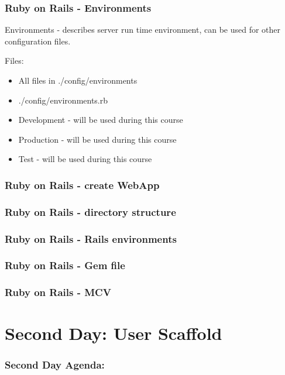 \documentclass{beamer}
\theoremstyle{mystyle}
\begin{document}
\begin{frame}
  \frametitle{Ruby on Rails - Environments}
  \begin{definition}
      Environments - describes server run time environment, can be used for other
      configuration files.
  \end{definition}
  Files:
  \begin{itemize}
  \item All files in ./config/environments
  \item ./config/environments.rb
  \end{itemize}
  \begin{example}
    \begin{itemize}
    \item Development - will be used during this course
    \item Production - will be used during this course
    \item Test - will be used during this course
    \end{itemize}
  \end{example}
  
\end{frame}

\begin{frame}
  \frametitle{Ruby on Rails - create WebApp}
  
\end{frame}


\begin{frame}
  \frametitle{Ruby on Rails - directory structure}
  
\end{frame}


\begin{frame}
  \frametitle{Ruby on Rails - Rails environments}
  
\end{frame}


\begin{frame}
  \frametitle{Ruby on Rails - Gem file}
  
\end{frame}

\begin{frame}
  \frametitle{Ruby on Rails - MCV}
  
\end{frame}

\section{Second Day: User Scaffold}
    \begin{frame}
      \frametitle{Second Day Agenda:}
      \tableofcontents
      [
      currentsection,
      sectionstyle=hide/hide,
      subsectionstyle=show/show/hide
      ]
    \end{frame}
\end{document}
